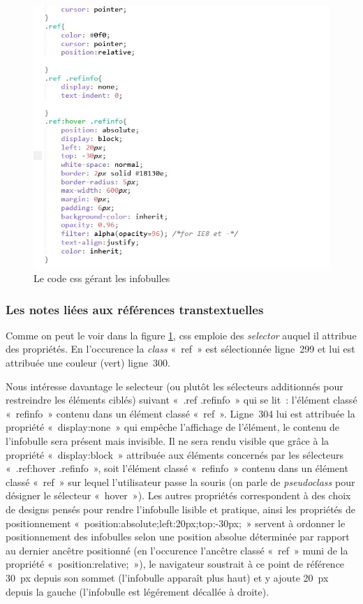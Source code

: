\begin{figure}[H]
    \centering
    \includegraphics[scale=0.8]{img/screen_css_infobulle.jpg}
    \caption{Le code css gérant les infobulles}
    \label{screenCssInfo}
\end{figure}

\subsubsection{Les notes liées aux références transtextuelles}

Comme on peut le voir dans la figure \ref{screenCssInfo}, css emploie des \textit{selector} auquel il attribue des propriétés. En l'occurence la \textit{class} «~ref~» est sélectionnée ligne~299 et lui est attribuée une couleur (vert) ligne~300.

Nous intéresse davantage le selecteur (ou plutôt les sélecteurs additionnés pour restreindre les éléments ciblés) suivant «~.ref .refinfo~» qui se lit~: l'élément classé «~refinfo~» contenu dans un élément classé «~ref~». Ligne~304 lui est attribuée la propriété «~display:none~» qui empêche l'affichage de l'élément, le contenu de l'infobulle sera présent mais invisible. Il ne sera rendu visible que grâce à la propriété «~display:block~» attribuée aux éléments concernés par les sélecteurs «~.ref:hover .refinfo~», soit l'élément classé «~refinfo~» contenu dans un élément classé «~ref~» sur lequel l'utilisateur passe la souris (on parle de \textit{pseudoclass} pour désigner le sélecteur «~hover~»). Les autres propriétés correspondent à des choix de designs pensés pour rendre l'infobulle lisible et pratique, ainsi les propriétés de positionnement «~position:absolute;left:20px;top:-30px;~» servent à ordonner le positionnement des infobulles selon une position absolue déterminée par rapport au dernier ancêtre positionné (en l'occurence l'ancêtre classé «~ref~» muni de la propriété «~position:relative;~»), le navigateur soustrait à ce point de référence 30~px depuis son sommet (l'infobulle apparaît plus haut) et y ajoute 20~px depuis la gauche (l'infobulle est légérement décallée à droite).

